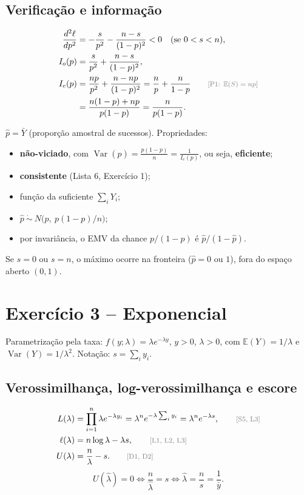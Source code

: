 \documentclass[11pt,a4paper]{article}
\newcommand{\E}{\mathbb{E}}
\newcommand{\Var}{\operatorname{Var}}
\newcommand{\bY}{\bar{Y}}
\newcommand{\just}[1]{\tag*{\footnotesize\textcolor{gray}{[#1]}}}
\theoremstyle{definition}
\theoremstyle{plain}
\begin{document}
\subsection*{Verificação e informação}
\begin{align*}
\frac{d^2\ell}{dp^2}&=-\frac{s}{p^2}-\frac{n-s}{(1-p)^2}<0\quad(\text{se }0<s<n),\\
I_o(p)&=\frac{s}{p^2}+\frac{n-s}{(1-p)^2},\\
I_e(p)&=\frac{np}{p^2}+\frac{n-np}{(1-p)^2}=\frac np+\frac{n}{1-p} \just{P1: $\E(S)=np$}\\
&=\frac{n(1-p)+np}{p(1-p)}=\frac{n}{p(1-p)}.
\end{align*}
\begin{resposta}
$\hat p=\bY$ (proporção amostral de sucessos). Propriedades:
\begin{itemize}[leftmargin=1.2em]
\item \textbf{não-viciado}, com $\Var(\hat p)=\frac{p(1-p)}{n}=\frac{1}{I_e(p)}$, ou seja, \textbf{eficiente};
\item \textbf{consistente} (Lista 6, Exercício 1);
\item função da suficiente $\sum_iY_i$;
\item $\hat p\ \dot\sim\ N\big(p,\ p(1-p)/n\big)$;
\item por invariância, o EMV da chance $p/(1-p)$ é $\hat p/(1-\hat p)$.
\end{itemize}
Se $s=0$ ou $s=n$, o máximo ocorre na fronteira ($\hat p=0$ ou $1$), fora do espaço aberto $(0,1)$.
\end{resposta}

\section{Exercício 3 -- Exponencial}

Parametrização pela taxa: $f(y;\lambda)=\lambda e^{-\lambda y}$, $y>0$, $\lambda>0$, com $\E(Y)=1/\lambda$ e $\Var(Y)=1/\lambda^2$. Notação: $s=\sum_iy_i$.

\subsection*{Verossimilhança, log-verossimilhança e escore}
\begin{align*}
L(\lambda)&=\prod_{i=1}^n\lambda e^{-\lambda y_i}=\lambda^n e^{-\lambda\sum_iy_i}=\lambda^ne^{-\lambda s}, \just{S5, L3}\\
\ell(\lambda)&=n\log\lambda-\lambda s, \just{L1, L2, L3}\\
U(\lambda)&=\frac{n}{\lambda}-s. \just{D1, D2}
\end{align*}
\[
U(\hat\lambda)=0\iff\frac{n}{\hat\lambda}=s\iff\hat\lambda=\frac ns=\frac{1}{\bar y}.
\]
\end{document}
